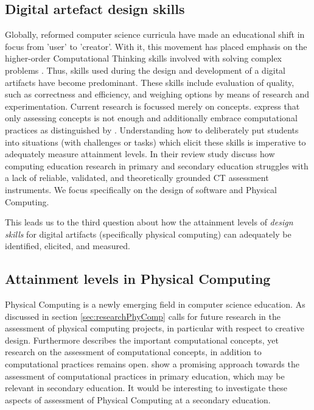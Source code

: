 \subsection*{Digital artefact design skills}
Globally, reformed computer science curricula have made an educational shift in focus from 'user' to 'creator'. With it, this movement has placed emphasis on the higher-order Computational Thinking skills involved with solving complex problems \cite{Wing2006}. Thus, skills used during the design and development of a digital artifacts have become predominant. These skills include evaluation of quality, such as correctness and efficiency, and weighing options by means of research and experimentation. Current research is focussed merely on concepts.  express that only assessing concepts is not enough and additionally embrace computational practices as distinguished by \citeauthor{BrennanResnick2012}. Understanding how to deliberately put students into situations (with challenges or tasks) which elicit these skills is imperative to adequately measure attainment levels. In their review study  discuss how computing education research in primary and secondary education struggles with a lack of reliable, validated, and theoretically grounded CT assessment instruments. We focus specifically on the design of software and Physical Computing.

This leads us to the third question about how the attainment levels of \emph{design skills} for digital artifacts (specifically physical computing) can adequately be identified, elicited, and measured.



\subsection*{Attainment levels in Physical Computing}
Physical Computing is a newly emerging field in computer science education. As discussed in section \ref{sec:researchPhyComp} \citeauthor{mareen2018PhysComp} calls for future research in the assessment of physical computing projects, in particular with respect to creative design. Furthermore \citeauthor{mareen2018PhysComp} describes the important computational concepts, yet research on the assessment of computational concepts, in addition to computational practices remains open.   show a promising approach towards the assessment of computational practices in primary education, which may be relevant in secondary education. It would be interesting to investigate these aspects of assessment of Physical Computing at a secondary education.


